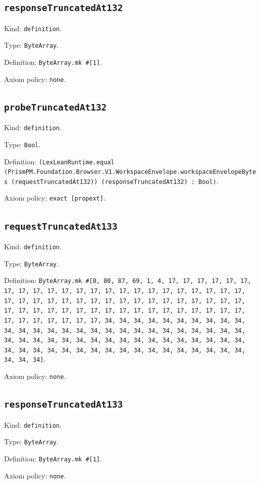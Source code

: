 \documentclass[11pt]{article}
\begin{document}
\subsection*{\texttt{responseTruncatedAt132}}
\noindent Kind: \texttt{definition}.\par
\noindent Type: \texttt{ByteArray}.\par
\noindent Definition: \texttt{ByteArray.mk \#[1]}.\par
\noindent Axiom policy: \texttt{none}.\par
\subsection*{\texttt{probeTruncatedAt132}}
\noindent Kind: \texttt{definition}.\par
\noindent Type: \texttt{Bool}.\par
\noindent Definition: \texttt{(LexLeanRuntime.equal (PrismPM.Foundation.Browser.V1.WorkspaceEnvelope.workspaceEnvelopeBytes (requestTruncatedAt132)) (responseTruncatedAt132) : Bool)}.\par
\noindent Axiom policy: \texttt{exact [propext]}.\par
\subsection*{\texttt{requestTruncatedAt133}}
\noindent Kind: \texttt{definition}.\par
\noindent Type: \texttt{ByteArray}.\par
\noindent Definition: \texttt{ByteArray.mk \#[0, 80, 87, 69, 1, 4, 17, 17, 17, 17, 17, 17, 17, 17, 17, 17, 17, 17, 17, 17, 17, 17, 17, 17, 17, 17, 17, 17, 17, 17, 17, 17, 17, 17, 17, 17, 17, 17, 17, 17, 17, 17, 17, 17, 17, 17, 17, 17, 17, 17, 17, 17, 17, 17, 17, 17, 17, 17, 17, 17, 17, 17, 17, 17, 17, 17, 17, 17, 17, 17, 34, 34, 34, 34, 34, 34, 34, 34, 34, 34, 34, 34, 34, 34, 34, 34, 34, 34, 34, 34, 34, 34, 34, 34, 34, 34, 34, 34, 34, 34, 34, 34, 34, 34, 34, 34, 34, 34, 34, 34, 34, 34, 34, 34, 34, 34, 34, 34, 34, 34, 34, 34, 34, 34, 34, 34, 34, 34, 34, 34, 34, 34, 34, 34]}.\par
\noindent Axiom policy: \texttt{none}.\par
\subsection*{\texttt{responseTruncatedAt133}}
\noindent Kind: \texttt{definition}.\par
\noindent Type: \texttt{ByteArray}.\par
\noindent Definition: \texttt{ByteArray.mk \#[1]}.\par
\noindent Axiom policy: \texttt{none}.\par
\end{document}
